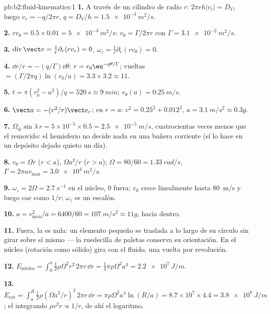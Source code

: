 \begin{solution}{pb:b2:fluid-kinematics:1}
\textbf{1.} A través de un cilindro de radio $r$: $2\pi rh|v_r| = D_V$, luego
$v_r = -q/2\pi r$, $q = D_V/h = \qty{1.5e-3}{m^2/s}$.

\textbf{2.} $rv_\theta = 0.5 \times 0.01 = \qty{5e-3}{m^2/s}$: $v_\theta = \Gamma/2\pi r$
con $\Gamma = \qty{3.1e-2}{m^2/s}$.

\textbf{3.} $\operatorname{div}\vect v = \frac1r\partial_r(rv_r) = 0$, $\omega_z =
\frac1r\partial_r(rv_\theta) = 0$.

\textbf{4.} $\dd r/r = -(q/\Gamma)\dd\theta$: $r = r_0\eu^{-q\theta/\Gamma}$; vueltas
$= (\Gamma/2\pi q)\ln(r_0/a) = 3.3 \times 3.2 \approx 11$.

\textbf{5.} $t = \pi(r_0^2 - a^2)/q = \qty{520}{s} \approx \qty{9}{min}$; $v_\theta(a) =
\qty{0.25}{m/s}$.

\textbf{6.} $\vect a = -(v^2/r)\vect e_r$; en $r = a$: $v^2 = 0.25^2 + 0.012^2$,
$a = \qty{3.1}{m/s^2} \approx 0.3g$.

\textbf{7.} $\Omega_\oplus\sin\lambda\,r = 5 \times 10^{-5} \times 0.5 = \qty{2.5e-5}{m/s}$,
cuatrocientas veces menos que el removido: el hemisferio no decide nada en
una bañera corriente (sí lo hace en un depósito dejado quieto un día).

\textbf{8.} $v_\theta = \Omega r$ ($r < a$), $\Omega a^2/r$ ($r > a$); $\Omega = 80/60
= \qty{1.33}{rad/s}$, $\Gamma = 2\pi av_{\max} = \qty{3.0e4}{m^2/s}$.

\textbf{9.} $\omega_z = 2\Omega = \qty{2.7}{s^{-1}}$ en el núcleo, $0$ fuera;
$v_\theta$ crece linealmente hasta \qty{80}{m/s} y luego cae como $1/r$; $\omega_z$ es un
escalón.

\textbf{10.} $a = v_{\max}^2/a = 6400/60 = \qty{107}{m/s^2} \approx 11g$, hacia dentro.

\textbf{11.} Fuera, la  es nula: un elemento pequeño se traslada
a lo largo de su círculo sin girar sobre sí mismo --- la ruedecilla de
paletas conserva su orientación. En el núcleo (rotación como sólido) gira
con el fluido, una vuelta por revolución.

\textbf{12.} $E_{\text{núcleo}} = \int_0^a\tfrac12\rho\Omega^2r^2\,2\pi r\,\dd r =
\tfrac14\pi\rho\Omega^2a^4 = \qty{2.2e7}{J/m}$.

\textbf{13.} $E_{\text{ext}} = \int_a^R\tfrac12\rho(\Omega a^2/r)^2\,2\pi r\,\dd r =
\pi\rho\Omega^2a^4\ln(R/a) = 8.7 \times 10^7 \times 4.4 = \qty{3.8e8}{J/m}$; el
integrando $\rho v^2r \propto 1/r$, de ahí el logaritmo.


\end{solution}
